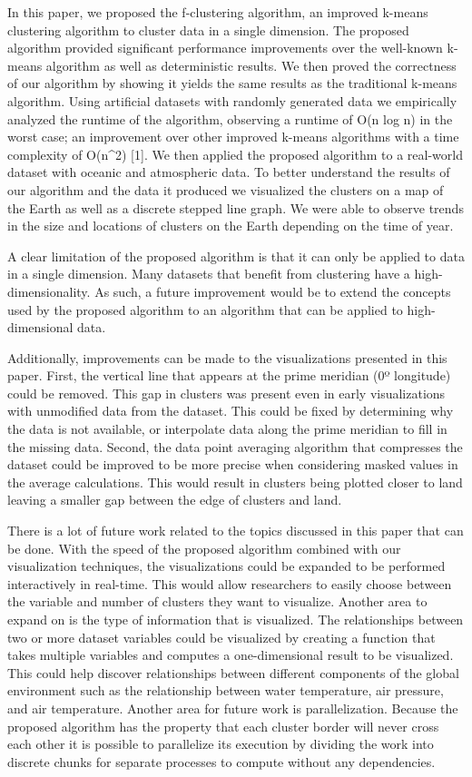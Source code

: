 \documentclass[conference,compsoc]{IEEEtran}
\begin{document}
In this paper, we proposed the f-clustering algorithm, an improved k-means clustering algorithm to cluster data in a single dimension. The proposed algorithm provided significant performance improvements over the well-known k-means algorithm as well as deterministic results. We then proved the correctness of our algorithm by showing it yields the same results as the traditional k-means algorithm. Using artificial datasets with randomly generated data we empirically analyzed the runtime of the algorithm, observing a runtime of O(n log n) in the worst case; an improvement over other improved k-means algorithms with a time complexity of O(n^2) [1]. We then applied the proposed algorithm to a real-world dataset with oceanic and atmospheric data. To better understand the results of our algorithm and the data it produced we visualized the clusters on a map of the Earth as well as a discrete stepped line graph. We were able to observe trends in the size and locations of clusters on the Earth depending on the time of year.

A clear limitation of the proposed algorithm is that it can only be applied to data in a single dimension. Many datasets that benefit from clustering have a high-dimensionality. As such, a future improvement would be to extend the concepts used by the proposed algorithm to an algorithm that can be applied to high-dimensional data. 

Additionally, improvements can be made to the visualizations presented in this paper. First, the vertical line that appears at the prime meridian (0º longitude) could be removed. This gap in clusters was present even in early visualizations with unmodified data from the dataset. This could be fixed by determining why the data is not available, or interpolate data along the prime meridian to fill in the missing data. Second, the data point averaging algorithm that compresses the dataset could be improved to be more precise when considering masked values in the average calculations. This would result in clusters being plotted closer to land leaving a smaller gap between the edge of clusters and land.

There is a lot of future work related to the topics discussed in this paper that can be done. With the speed of the proposed algorithm combined with our visualization techniques, the visualizations could be expanded to be performed interactively in real-time. This would allow researchers to easily choose between the variable and number of clusters they want to visualize. Another area to expand on is the type of information that is visualized. The relationships between two or more dataset variables could be visualized by creating a function that takes multiple variables and computes a one-dimensional result to be visualized. This could help discover relationships between different components of the global environment such as the relationship between water temperature, air pressure, and air temperature. Another area for future work is parallelization. Because the proposed algorithm has the property that each cluster border will never cross each other it is possible to parallelize its execution by dividing the work into discrete chunks for separate processes to compute without any dependencies.
\end{document}
